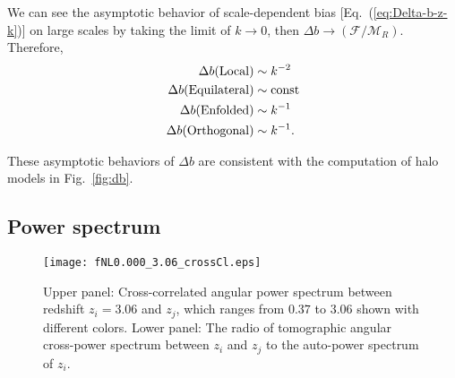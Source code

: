 \documentclass[twocolumn,floatfix,nofootinbib,aps,reprint]{revtex4}
\begin{document}
We can see the asymptotic behavior of scale-dependent bias [Eq.~(\ref{eq:Delta-b-z-k})] on large scales by taking the limit of $k\rightarrow0$, then $\Delta b\rightarrow(\mathcal{F}/\mathcal{M}_R)$. Therefore,
\begin{equation}
    \begin{split}
        \Delta b (\mathrm{Local})       & \sim k^{-2} \\
        \Delta b (\mathrm{Equilateral}) & \sim {\rm const}  \\
        \Delta b (\mathrm{Enfolded})    & \sim  k^{-1} \\
        \Delta b (\mathrm{Orthogonal})  & \sim  k^{-1}. 
    \end{split}
\end{equation}

These asymptotic behaviors of $\Delta b$ are consistent with the computation of halo models in Fig.~\ref{fig:db}.




\subsection{Power spectrum}
\begin{figure}[htb]
    \centering
    \texttt{[image: fNL0.000\_3.06\_crossCl.eps]}
    \vspace{-0.6cm}
    \caption{
        Upper panel: Cross-correlated angular power spectrum between redshift 
        $z_i=3.06$ and $z_j$, which ranges from $0.37$ to $3.06$ shown with 
        different colors.
        Lower panel: The radio of tomographic angular cross-power spectrum 
        between $z_i$ and $z_j$ to the auto-power spectrum of $z_i$.
    }\label{fig:clij}
\end{figure}
\end{document}
